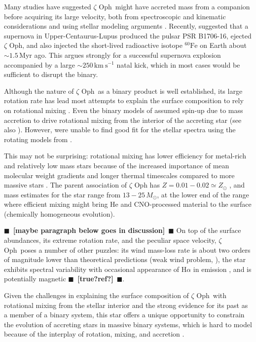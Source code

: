 \documentclass[twocolumn,twocolappendix,trackchanges]{aastex63}
\newcommand{\kms}{{\mathrm{km\ s^{-1}}}}
\newcommand{\zoph}{$\zeta$ Oph}
\newcommand{\todo}[1]{{\large $\blacksquare$~\textbf{\color{red}[#1]}}~$\blacksquare$}
\begin{document}
Many studies have suggested \zoph\ might have accreted mass from a
companion before acquiring its large velocity, both from spectroscopic
and kinematic considerations \citep[e.g.,][]{blaauw:93, hoogerwerf:00,
  hoogerwerf:01, tetzlaff:10, neuhauser:20} and using stellar modeling
arguments \citep[e.g.,][]{vanrensbergen:96}. Recently,
\cite{neuhauser:20} suggested that a supernova in
Upper-Centaurus-Lupus produced the pulsar PSR B1706-16, ejected \zoph,
and also injected the short-lived radioactive isotope
$^{60}\mathrm{Fe}$ on Earth about $\sim 1.5$\,Myr ago. This argues
strongly for a successful supernova explosion accompanied by a large
$\sim 250\,\kms$ natal kick, which in most cases would be sufficient
to disrupt the binary.

Although the nature of \zoph\ as a binary product is well
established, its large rotation rate has lead most attempts to explain
the surface composition to rely on rotational mixing
\cite[e.g.,][]{maeder:00}. Even the binary models of
\cite{vanrensbergen:96} assumed spin-up due to mass accretion
\citep[e.g.,][]{packet:81} to drive rotational mixing from the
interior of the accreting star (see also
\citealt{cantiello:07}). However, \cite{villamariz:05} were unable to
find good fit for the stellar spectra using the rotating models from
\cite{meynet:00}.

This may not be surprising: rotational mixing has
lower efficiency for metal-rich and relatively low mass stars because
of the increased importance of mean molecular weight gradients and
longer thermal timescales compared to more massive stars
\citep[e.g.,][]{yoon:06, perna:14}. The parent association of $\zeta$
Oph has $Z=0.01-0.02\simeq Z_\odot$ \citep[e.g.,][]{murphy:21}, and
mass estimates for the star range from $13-25\,M_\odot$, at the
lower end of the range where efficient mixing might bring He and
CNO-processed material to the surface (chemically homogeneous
evolution).

\todo{maybe paragraph below goes in discussion}
On top of the surface abundances, its extreme rotation rate, and the
peculiar space velocity, \zoph\ poses a number of other
puzzles: its wind mass-loss rate is about two orders of magnitude
lower than theoretical predictions (weak wind problem,
\citealt{marcolino:09}), the star exhibits spectral variability with
occasional appearance of H$\alpha$ in emission
\citep[e.g.,][]{walker:79}, and is potentially magnetic \todo{true?ref?}.

Given the challenges in explaining the surface composition of \zoph\
with rotational mixing from the stellar interior and the strong
evidence for its past as a member of a binary system, this star offers
a unique opportunity to constrain the evolution of accreting stars in
massive binary systems, which is hard to model because of the
interplay of rotation, mixing, and accretion
\citep[e.g.][]{hellings:83, hellings:84, braun:95}.
\end{document}
